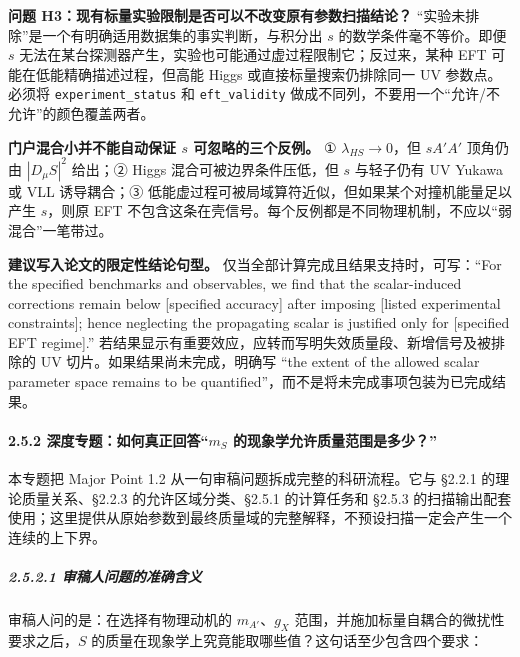 \documentclass[
]{article}
\begin{document}
\textbf{问题 H3：现有标量实验限制是否可以不改变原有参数扫描结论？}
``实验未排除''是一个有明确适用数据集的事实判断，与积分出 \(s\)
的数学条件毫不等价。即便 \(s\)
无法在某台探测器产生，实验也可能通过虚过程限制它；反过来，某种 EFT
可能在低能精确描述过程，但高能 Higgs 或直接标量搜索仍排除同一 UV
参数点。必须将 \texttt{experiment\_status} 和 \texttt{eft\_validity}
做成不同列，不要用一个``允许/不允许''的颜色覆盖两者。

\textbf{门户混合小并不能自动保证 \(s\) 可忽略的三个反例。} ①
\(\lambda_{HS}\to0\)，但 \(sA'A'\) 顶角仍由 \(|D_\mu S|^2\) 给出；②
Higgs 混合可被边界条件压低，但 \(s\) 与轻子仍有 UV Yukawa 或 VLL
诱导耦合；③ 低能虚过程可被局域算符近似，但如果某个对撞机能量足以产生
\(s\)，则原 EFT
不包含这条在壳信号。每个反例都是不同物理机制，不应以``弱混合''一笔带过。

\textbf{建议写入论文的限定性结论句型。}
仅当全部计算完成且结果支持时，可写：``For the specified benchmarks and
observables, we find that the scalar-induced corrections remain below
{[}specified accuracy{]} after imposing {[}listed experimental
constraints{]}; hence neglecting the propagating scalar is justified
only for {[}specified EFT regime{]}.''
若结果显示有重要效应，应转而写明失效质量段、新增信号及被排除的 UV
切片。如果结果尚未完成，明确写 ``the extent of the allowed scalar
parameter space remains to be
quantified''，而不是将未完成事项包装为已完成结果。

\paragraph{\texorpdfstring{2.5.2 深度专题：如何真正回答``\(m_S\)
的现象学允许质量范围是多少？''}{2.5.2 深度专题：如何真正回答``m\_S 的现象学允许质量范围是多少？''}}\label{ux6df1ux5ea6ux4e13ux9898ux5982ux4f55ux771fux6b63ux56deux7b54m_s-ux7684ux73b0ux8c61ux5b66ux5141ux8bb8ux8d28ux91cfux8303ux56f4ux662fux591aux5c11}

本专题把 Major Point 1.2 从一句审稿问题拆成完整的科研流程。它与 §2.2.1
的理论质量关系、§2.2.3 的允许区域分类、§2.5.1 的计算任务和 §2.5.3
的扫描输出配套使用；这里提供从原始参数到最终质量域的完整解释，不预设扫描一定会产生一个连续的上下界。

\subparagraph{2.5.2.1
审稿人问题的准确含义}\label{ux5ba1ux7a3fux4ebaux95eeux9898ux7684ux51c6ux786eux542bux4e49}

审稿人问的是：在选择有物理动机的 \(m_{A'}\)、\(g_X\)
范围，并施加标量自耦合的微扰性要求之后，\(S\)
的质量在现象学上究竟能取哪些值？这句话至少包含四个要求：
\end{document}
